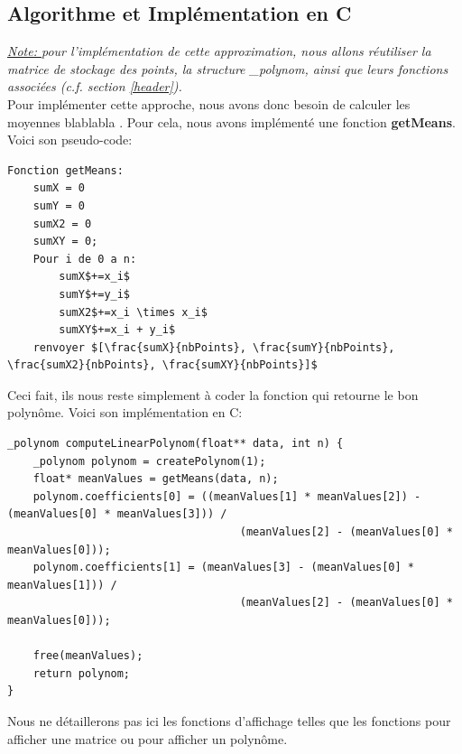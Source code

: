 \subsection{Algorithme et Implémentation en C}
\textit{\underline{Note: } pour l'implémentation de cette approximation, nous allons réutiliser la matrice de stockage des points, la structure \_polynom, ainsi que leurs fonctions associées (c.f. section \ref{header}).}\vspace{5pt}\\
Pour implémenter cette approche, nous avons donc besoin de calculer les moyennes blablabla . Pour cela, nous avons implémenté une fonction \textbf{getMeans}. Voici son pseudo-code:\\
\begin{lstlisting}[mathescape=true, basicstyle=\fontsize{8}{10}\selectfont]
Fonction getMeans:
    sumX = 0
    sumY = 0
    sumX2 = 0
    sumXY = 0;
    Pour i de 0 a n:
        sumX$+=x_i$
        sumY$+=y_i$
        sumX2$+=x_i \times x_i$
        sumXY$+=x_i + y_i$
    renvoyer $[\frac{sumX}{nbPoints}, \frac{sumY}{nbPoints}, \frac{sumX2}{nbPoints}, \frac{sumXY}{nbPoints}]$
\end{lstlisting}
Ceci fait, ils nous reste simplement à coder la fonction qui retourne le bon polynôme. Voici son implémentation en C:\\
\begin{lstlisting}[mathescape=true, basicstyle=\fontsize{8}{10}\selectfont]
_polynom computeLinearPolynom(float** data, int n) {
    _polynom polynom = createPolynom(1);
    float* meanValues = getMeans(data, n);
    polynom.coefficients[0] = ((meanValues[1] * meanValues[2]) - (meanValues[0] * meanValues[3])) /
                                    (meanValues[2] - (meanValues[0] * meanValues[0]));
    polynom.coefficients[1] = (meanValues[3] - (meanValues[0] * meanValues[1])) /
                                    (meanValues[2] - (meanValues[0] * meanValues[0]));
    
    free(meanValues);
    return polynom;
}
\end{lstlisting}
Nous ne détaillerons pas ici les fonctions d'affichage telles que les fonctions pour afficher une matrice ou pour afficher un polynôme.
\newpage
